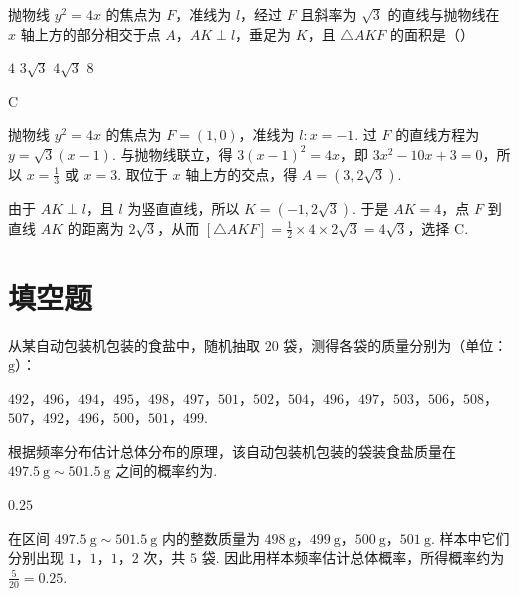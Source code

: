 \begin{problem}
抛物线 \( y^{2} = 4x \) 的焦点为 \(F\)，准线为 \(l\)，经过 \(F\) 且斜率为 \(\sqrt{3}\) 的直线与抛物线在 \(x\) 轴上方的部分相交于点 \(A\)，\(AK \perp l\)，垂足为 \(K\)，且 \(\triangle AKF\) 的面积是（\quad）

\choices
    {\(4\)}
    {\(3\sqrt{3}\)}
    {\(4\sqrt{3}\)}
    {\(8\)}
\end{problem}

\begin{answer}
C
\end{answer}

\begin{solution}
抛物线 \(y^2=4x\) 的焦点为 \(F=(1,0)\)，准线为 \(l:x=-1\). 过 \(F\) 的直线方程为
\(y=\sqrt{3}(x-1)\). 与抛物线联立，得
\(3(x-1)^2=4x\)，即 \(3x^2-10x+3=0\)，所以 \(x=\frac{1}{3}\) 或 \(x=3\). 取位于 \(x\) 轴上方的交点，得 \(A=(3,2\sqrt{3})\).

由于 \(AK\perp l\)，且 \(l\) 为竖直直线，所以 \(K=(-1,2\sqrt{3})\). 于是 \(AK=4\)，点 \(F\) 到直线 \(AK\) 的距离为 \(2\sqrt{3}\)，从而
\([\triangle AKF]=\frac{1}{2}\times4\times2\sqrt{3}=4\sqrt{3}\)，选择 C.
\end{solution}

\section{填空题}

\begin{problem}
从某自动包装机包装的食盐中，随机抽取 \(20\text{ 袋}\)，测得各袋的质量分别为（单位：\(\mathrm{g}\)）：

\(492\)，\(496\)，\(494\)，\(495\)，\(498\)，\(497\)，\(501\)，\(502\)，\(504\)，\(496\)，\(497\)，\(503\)，\(506\)，\(508\)，\(507\)，\(492\)，\(496\)，\(500\)，\(501\)，\(499\).

根据频率分布估计总体分布的原理，该自动包装机包装的袋装食盐质量在 \(497.5\mathrm{~g}\sim 501.5\mathrm{~g}\) 之间的概率约为\fillinblank{}.
\end{problem}

\begin{answer}
\(0.25\)
\end{answer}

\begin{solution}
在区间 \(497.5\mathrm{~g}\sim501.5\mathrm{~g}\) 内的整数质量为 \(498\mathrm{~g}\)，\(499\mathrm{~g}\)，\(500\mathrm{~g}\)，\(501\mathrm{~g}\). 样本中它们分别出现 \(1\)，\(1\)，\(1\)，\(2\) 次，共 \(5\) 袋. 因此用样本频率估计总体概率，所得概率约为
\(\frac{5}{20}=0.25\).
\end{solution}

